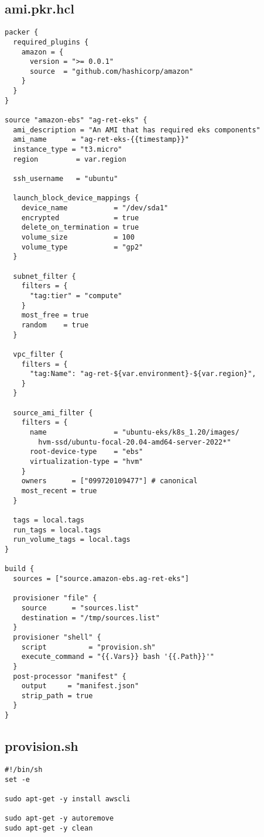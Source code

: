 \subsection*{ami.pkr.hcl}
\begin{verbatim}
packer {
  required_plugins {
    amazon = {
      version = ">= 0.0.1"
      source  = "github.com/hashicorp/amazon"
    }
  }
}

source "amazon-ebs" "ag-ret-eks" {
  ami_description = "An AMI that has required eks components"
  ami_name      = "ag-ret-eks-{{timestamp}}"
  instance_type = "t3.micro"
  region         = var.region

  ssh_username   = "ubuntu"

  launch_block_device_mappings {
    device_name           = "/dev/sda1"
    encrypted             = true
    delete_on_termination = true
    volume_size           = 100
    volume_type           = "gp2"
  }
  
  subnet_filter {
    filters = {
      "tag:tier" = "compute"
    }
    most_free = true
    random    = true
  }
  
  vpc_filter {
    filters = {
      "tag:Name": "ag-ret-${var.environment}-${var.region}",
    }
  }

  source_ami_filter {
    filters = {
      name                = "ubuntu-eks/k8s_1.20/images/
        hvm-ssd/ubuntu-focal-20.04-amd64-server-2022*"
      root-device-type    = "ebs"
      virtualization-type = "hvm"
    }
    owners      = ["099720109477"] # canonical
    most_recent = true
  }
  
  tags = local.tags
  run_tags = local.tags
  run_volume_tags = local.tags
}

build {
  sources = ["source.amazon-ebs.ag-ret-eks"]

  provisioner "file" {
    source      = "sources.list"
    destination = "/tmp/sources.list"
  }
  provisioner "shell" {
    script          = "provision.sh"
    execute_command = "{{.Vars}} bash '{{.Path}}'"
  }
  post-processor "manifest" {
    output     = "manifest.json"
    strip_path = true
  }
}

\end{verbatim}

\subsection*{provision.sh}
\begin{verbatim}
#!/bin/sh
set -e

sudo apt-get -y install awscli

sudo apt-get -y autoremove
sudo apt-get -y clean
\end{verbatim}